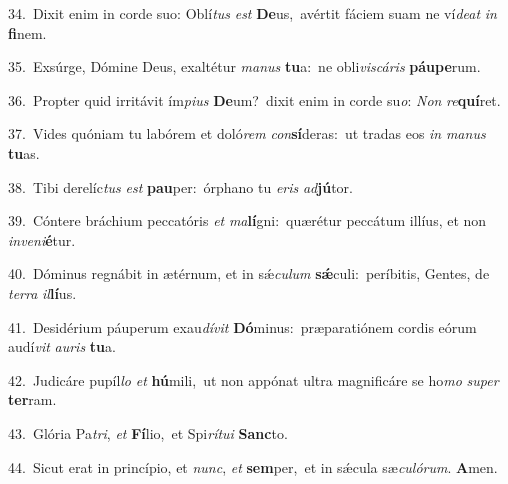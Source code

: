 {\numbfont\textcolor{\numbcolor}{34.}}~Dixit enim in corde suo: Oblí\textit{tus} \textit{est} \textbf{De}\-us,~\star avértit fáciem suam ne ví\-\textit{de}\-\textit{at} \textit{in} \textbf{fi}\-nem.\par
{\numbfont\textcolor{\numbcolor}{35.}}~Exsúrge, Dómine Deus, exaltétur \textit{ma}\-\textit{nus} \textbf{tu}\-a:~\star ne obli\-\textit{vis}\-\textit{cá}\textit{ris} \textbf{páu}\-\textbf{pe}rum.\par
{\numbfont\textcolor{\numbcolor}{36.}}~Propter quid irritávit ím\-\textit{pi}\-\textit{us} \textbf{De}\-um?~\star dixit enim in corde su\-\textit{o}\-: \textit{Non} \textit{re}\-\textbf{quí}ret.\par
{\numbfont\textcolor{\numbcolor}{37.}}~Vides quóniam tu labórem et doló\textit{rem} \textit{con}\-\textbf{sí}deras:~\star ut tradas eos \textit{in} \textit{ma}\-\textit{nus} \textbf{tu}\-as.\par
{\numbfont\textcolor{\numbcolor}{38.}}~Tibi derelíc\textit{tus} \textit{est} \textbf{pau}\-per:~\star órphano tu \textit{e}\-\textit{ris} \textit{ad}\-\textbf{jú}tor.\par
{\numbfont\textcolor{\numbcolor}{39.}}~Cóntere bráchium peccatóris \textit{et} \textit{ma}\-\textbf{lí}gni:~\star quærétur peccátum illíus, et non \textit{in}\-\textit{ve}\textit{ni}\textbf{é}tur.\par
{\numbfont\textcolor{\numbcolor}{40.}}~Dóminus regnábit in ætérnum, et in sǽ\-\textit{cu}\-\textit{lum} \textbf{sǽ}\-culi:~\star períbitis, Gentes, de \textit{ter}\-\textit{ra} \textit{il}\-\textbf{lí}us.\par
{\numbfont\textcolor{\numbcolor}{41.}}~Desidérium páuperum exau\-\textit{dí}\-\textit{vit} \textbf{Dó}\-minus:~\star præparatiónem cordis eórum audí\textit{vit} \textit{au}\-\textit{ris} \textbf{tu}\-a.\par
{\numbfont\textcolor{\numbcolor}{42.}}~Judicáre pupíl\textit{lo} \textit{et} \textbf{hú}\-mili,~\star ut non appónat ultra magnificáre se ho\textit{mo} \textit{su}\-\textit{per} \textbf{ter}\-ram.\par
{\numbfont\textcolor{\numbcolor}{43.}}~Glória Pa\-\textit{tri}\-, \textit{et} \textbf{Fí}\-lio,~\star et Spi\-\textit{rí}\-\textit{tu}\textit{i} \textbf{Sanc}\-to.\par
{\numbfont\textcolor{\numbcolor}{44.}}~Sicut erat in princípio, et \textit{nunc}\-, \textit{et} \textbf{sem}\-per,~\star et in sǽcula sæ\-\textit{cu}\-\textit{ló}\textit{rum}. \textbf{A}\-men.\par
